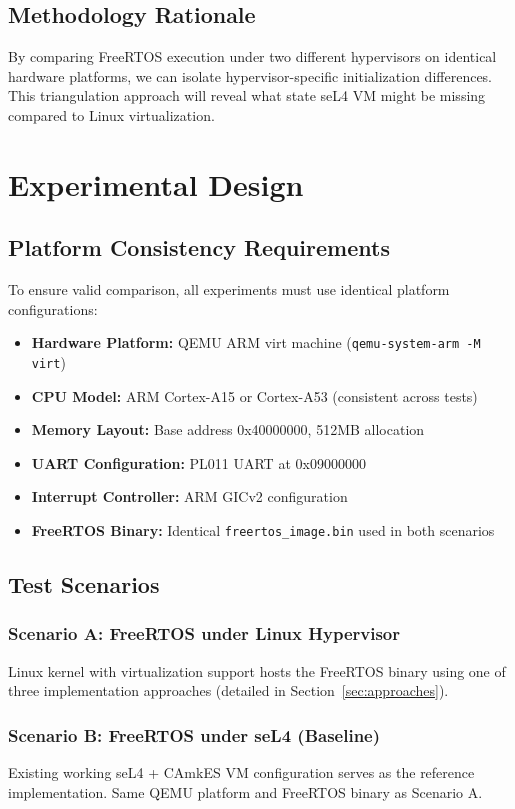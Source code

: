 \documentclass[11pt,a4paper]{article}
\begin{document}
\subsection{Methodology Rationale}
By comparing FreeRTOS execution under two different hypervisors on identical hardware platforms, we can isolate hypervisor-specific initialization differences. This triangulation approach will reveal what state seL4 VM might be missing compared to Linux virtualization.

\section{Experimental Design}

\subsection{Platform Consistency Requirements}
To ensure valid comparison, all experiments must use identical platform configurations:

\begin{itemize}
    \item \textbf{Hardware Platform:} QEMU ARM virt machine (\texttt{qemu-system-arm -M virt})
    \item \textbf{CPU Model:} ARM Cortex-A15 or Cortex-A53 (consistent across tests)
    \item \textbf{Memory Layout:} Base address 0x40000000, 512MB allocation
    \item \textbf{UART Configuration:} PL011 UART at 0x09000000
    \item \textbf{Interrupt Controller:} ARM GICv2 configuration
    \item \textbf{FreeRTOS Binary:} Identical \texttt{freertos\_image.bin} used in both scenarios
\end{itemize}

\subsection{Test Scenarios}

\subsubsection{Scenario A: FreeRTOS under Linux Hypervisor}
Linux kernel with virtualization support hosts the FreeRTOS binary using one of three implementation approaches (detailed in Section~\ref{sec:approaches}).

\subsubsection{Scenario B: FreeRTOS under seL4 (Baseline)}
Existing working seL4 + CAmkES VM configuration serves as the reference implementation. Same QEMU platform and FreeRTOS binary as Scenario A.
\end{document}
